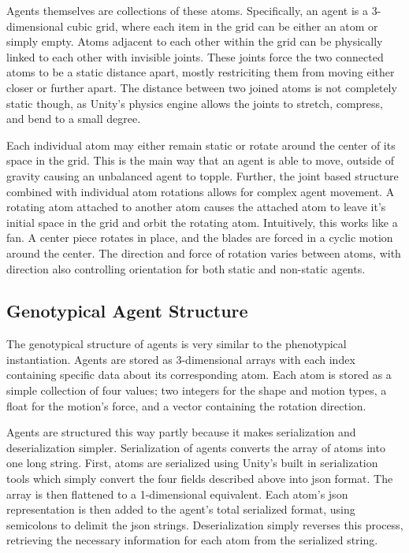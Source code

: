 \documentclass[runningheads]{llncs}
\begin{document}
Agents themselves are collections of these atoms.
Specifically, an agent is a 3-dimensional cubic grid, where each item in the grid can be either an atom or simply empty.
Atoms adjacent to each other within the grid can be physically linked to each other with invisible joints. 
These joints force the two connected atoms to be a static distance apart, mostly restriciting them from moving either closer or further apart.
The distance between two joined atoms is not completely static though, as Unity's physics engine allows the joints to stretch, compress, and bend to a small degree.

Each individual atom may either remain static or rotate around the center of its space in the grid.
This is the main way that an agent is able to move, outside of gravity causing an unbalanced agent to topple.
Further, the joint based structure combined with individual atom rotations allows for complex agent movement.
A rotating atom attached to another atom causes the attached atom to leave it's initial space in the grid and orbit the rotating atom.
Intuitively, this works like a fan.
A center piece rotates in place, and the blades are forced in a cyclic motion around the center.
The direction and force of rotation varies between atoms, with direction also controlling orientation for both static and non-static agents.

\subsection{Genotypical Agent Structure}

The genotypical structure of agents is very similar to the phenotypical instantiation.
Agents are stored as 3-dimensional arrays with each index containing specific data about its corresponding atom.
Each atom is stored as a simple collection of four values; 
two integers for the shape and motion types, a float for the motion's force, and a vector containing the rotation direction.

Agents are structured this way partly because it makes serialization and deserialization simpler.
Serialization of agents converts the array of atoms into one long string.
First, atoms are serialized using Unity's built in serialization tools which simply convert the four fields described above into json format.
The array is then flattened to a 1-dimensional equivalent.
Each atom's json representation is then added to the agent's total serialized format, using semicolons to delimit the json strings.
Deserialization simply reverses this process, retrieving the necessary information for each atom from the serialized string.
\end{document}

